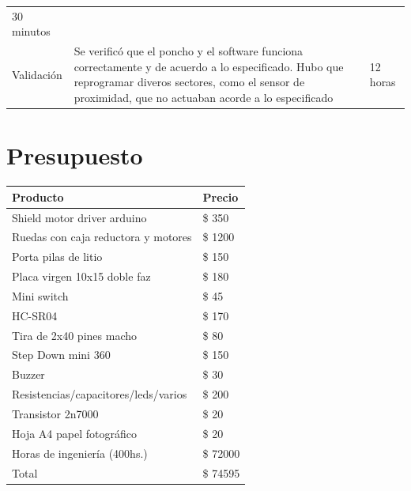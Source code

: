 \begin{longtable}[]{@{}lll@{}}
\begin{minipage}[t]{0.10\columnwidth}
30 minutos\strut
\end{minipage}\tabularnewline
\begin{minipage}[t]{0.17\columnwidth}\raggedright
Validación\strut
\end{minipage} & \begin{minipage}[t]{0.64\columnwidth}\raggedright
Se verificó que el poncho y el software funciona correctamente y de
acuerdo a lo especificado. Hubo que reprogramar diveros sectores, como
el sensor de proximidad, que no actuaban acorde a lo especificado\strut
\end{minipage} & \begin{minipage}[t]{0.10\columnwidth}\raggedright
12 horas\strut
\end{minipage}\tabularnewline
\bottomrule
\end{longtable}

\section{Presupuesto}

\begin{longtable}[]{@{}ll@{}}
\toprule
Producto & Precio\tabularnewline
\midrule
\endhead
Shield motor driver arduino & \$ 350\tabularnewline
Ruedas con caja reductora y motores & \$ 1200\tabularnewline
Porta pilas de litio & \$ 150\tabularnewline
Placa virgen 10x15 doble faz & \$ 180\tabularnewline
Mini switch & \$ 45\tabularnewline
HC-SR04 & \$ 170\tabularnewline
Tira de 2x40 pines macho & \$ 80\tabularnewline
Step Down mini 360 & \$ 150\tabularnewline
Buzzer & \$ 30\tabularnewline
Resistencias/capacitores/leds/varios & \$ 200\tabularnewline
Transistor 2n7000 & \$ 20\tabularnewline
Hoja A4 papel fotográfico & \$ 20\tabularnewline
Horas de ingeniería (400hs.) & \$ 72000\tabularnewline
Total & \$ 74595\tabularnewline
\bottomrule
\end{longtable}
